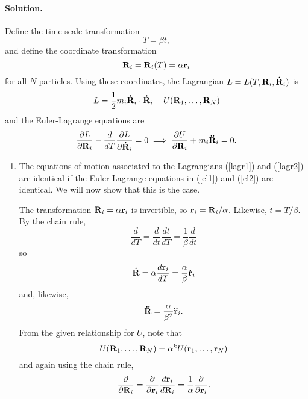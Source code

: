 \documentclass[11pt]{article}
\newcommand{\pder}[2]{\frac{\partial#1}{\partial#2}}
\newcommand{\der}[2]{\frac{d#1}{d#2}}
\newcommand{\refeq}[1]{(\ref{#1})}
\newenvironment{solution}
{
    \paragraph{Solution.}
    \ignorespaces
}
{
    \bigskip\bigskip
}
\begin{document}
\begin{enumerate}
\begin{solution}
		 Define the time scale transformation
		 \begin{equation}
		 	T = \beta t,
		\end{equation}
		and define the coordinate transformation
		\begin{equation}
			\mathbf{R}_i = \mathbf{R}_i(T) = \alpha \mathbf{r}_i
		\end{equation}
		for all $N$ particles.  Using these coordinates, the Lagrangian $L = L(T, \mathbf{R}_i, \mathbf{\dot{R}}_i)$ is
		\begin{equation} \label{lagr2}
			L = \frac{1}{2} m_i \mathbf{\dot{R}}_i \cdot \mathbf{\dot{R}}_i - U(\mathbf{R}_1, \ldots, \mathbf{R}_N)
		\end{equation}
		and the Euler-Lagrange equations are
		\begin{equation} \label{el2}
			\pder{L}{\vR_i} - \der{}{T} \pder{L}{\vRd_i} = 0 \implies \pder{U}{\vR_i} + m_i \vRdd_i = 0.
		\end{equation}
		
		\begin{enumerate}
			\item The equations of motion associated to the Lagrangians \refeq{lagr1} and \refeq{lagr2} are identical if the Euler-Lagrange equations in \refeq{el1} and \refeq{el2} are identical.  We will now show that this is the case.
			
			The transformation $\mathbf{R}_i = \alpha \mathbf{r}_i$ is invertible, so $\mathbf{r}_i = \mathbf{R}_i / \alpha$.  Likewise, $t = T / \beta$.  By the chain rule,
			\begin{equation} \label{transT}
				\der{}{T} = \der{}{t} \der{t}{T} = \frac{1}{\beta} \der{}{t}
			\end{equation}
			so
			\begin{equation}
				\vRd = \alpha \der{\vr_i}{T} = \frac{\alpha}{\beta} \vrd_i
			\end{equation}
			and, likewise,
			\begin{equation} \label{secondder}
				\mathbf{\ddot{R}} = \frac{\alpha}{\beta^2} \mathbf{\ddot{r}}_i.
			\end{equation}
			From the given relationship for $U$, note that
			\begin{equation} \label{urel}
				U(\mathbf{R}_1, \ldots, \mathbf{R}_N) = \alpha^k U(\mathbf{r}_1, \ldots, \mathbf{r}_N)
			\end{equation}
			and again using the chain rule,
			\begin{equation} \label{rpart}
				\pder{}{\vR_i} = \pder{}{\vr_i} \der{\vr_i}{\vR_i} = \frac{1}{\alpha} \pder{}{\vr_i}.
			\end{equation}
			

\end{enumerate}
\end{solution}
\end{enumerate}
\end{document}
